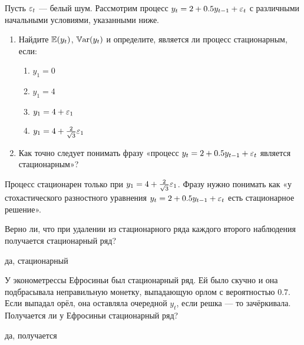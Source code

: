 \begin{problem}
Пусть $\varepsilon_t$ — белый шум. Рассмотрим процесс $y_t=2+0.5y_{t-1}+\varepsilon_t$ с различными начальными условиями, указанными ниже.

\begin{enumerate}
\item Найдите $\mathbb{E}(y_t)$, $\mathbb{V}\mathrm{ar}(y_t)$ и определите, является ли процесс  стационарным, если:
\begin{enumerate}
\item $y_1=0$
\item $y_1=4$
\item $y_1=4+\varepsilon_1$
\item $y_1=4+\frac{2}{\sqrt{3}}\varepsilon_1$
\end{enumerate}
\item Как точно следует понимать фразу «процесс $y_t=2+0.5y_{t-1}+\varepsilon_t$ является стационарным»?
\end{enumerate}




\begin{sol}
Процесс стационарен только при $y_1=4+\frac{2}{\sqrt{3}}\varepsilon_1$. Фразу нужно понимать как «у стохастического разностного уравнения $y_t=2+0.5y_{t-1}+\varepsilon_t$ есть стационарное решение».
\end{sol}
\end{problem}




\begin{problem}
Верно ли, что при удалении из стационарного ряда каждого второго наблюдения получается стационарный ряд?


\begin{sol}
да, стационарный
\end{sol}
\end{problem}



\begin{problem}
У эконометрессы Ефросиньи был стационарный ряд. Ей было скучно и она подбрасывала неправильную монетку, выпадающую орлом с вероятностью $0.7$. Если выпадал орёл, она оставляла очередной $y_t$, если решка — то зачёркивала. Получается ли у Ефросиньи стационарный ряд?


\begin{sol}
да, получается
\end{sol}
\end{problem}


